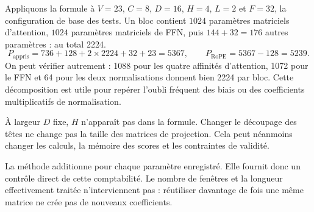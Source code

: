 Appliquons la formule à $V=23$, $C=8$, $D=16$, $H=4$, $L=2$ et $F=32$, la configuration de base des tests. Un bloc contient $1024$ paramètres matriciels d'attention, $1024$ paramètres matriciels de FFN, puis $144+32=176$ autres paramètres : au total 2224.
\[
 P_{\mathrm{appris}}
 =736+128+2\times2224+32+23=5367,
 \qquad P_{\mathrm{RoPE}}=5367-128=5239.
\]
On peut vérifier autrement : 1088 pour les quatre affinités d'attention, 1072 pour le FFN et 64 pour les deux normalisations donnent bien 2224 par bloc. Cette décomposition est utile pour repérer l'oubli fréquent des biais ou des coefficients multiplicatifs de normalisation.

À largeur $D$ fixe, $H$ n'apparaît pas dans la formule. Changer le découpage des têtes ne change pas la taille des matrices de projection. Cela peut néanmoins changer les calculs, la mémoire des scores et les contraintes de validité.

La méthode  additionne  pour chaque paramètre enregistré. Elle fournit donc un contrôle direct de cette comptabilité. Le nombre de fenêtres et la longueur effectivement traitée n'interviennent pas : réutiliser davantage de fois une même matrice ne crée pas de nouveaux coefficients.






